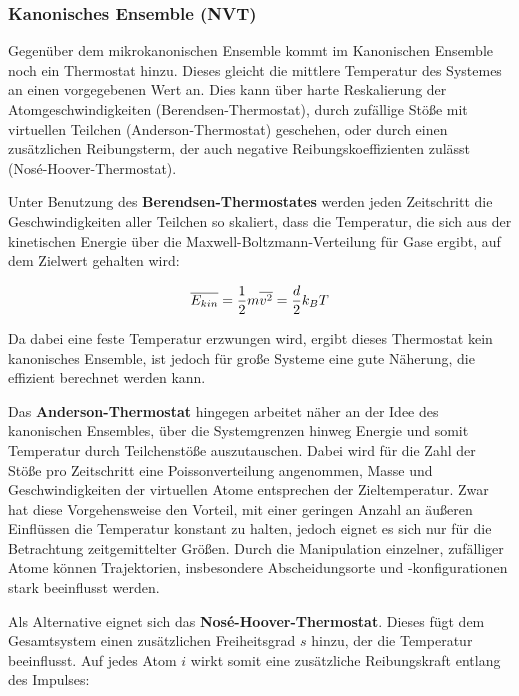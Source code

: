 \subsubsection{Kanonisches Ensemble (NVT)}

Gegenüber dem mikrokanonischen Ensemble kommt im Kanonischen Ensemble noch ein Thermostat hinzu.
Dieses gleicht die mittlere Temperatur des Systemes an einen vorgegebenen Wert an.
Dies kann über harte Reskalierung der Atomgeschwindigkeiten (Berendsen-Thermostat), durch zufällige Stöße mit virtuellen Teilchen (Anderson-Thermostat) geschehen, oder durch einen zusätzlichen Reibungsterm, der auch negative Reibungskoeffizienten zulässt (Nosé-\-Hoover-\-Thermostat).

Unter Benutzung des \textbf{Berendsen-Thermostates} werden jeden Zeitschritt die Geschwindigkeiten aller Teilchen so skaliert, dass die Temperatur, die sich aus der kinetischen Energie über die Maxwell-Boltzmann-Verteilung für Gase ergibt, auf dem Zielwert gehalten wird:

\begin{equation}
  \overline{E_{kin}} = {1\over2} m\overline{v^2} = {d\over2}k_BT
\end{equation}


Da dabei eine feste Temperatur erzwungen wird, ergibt dieses Thermostat kein kanonisches Ensemble, ist jedoch für große Systeme eine gute Näherung, die effizient berechnet werden kann.

Das \textbf{Anderson-Thermostat} hingegen arbeitet näher an der Idee des kanonischen Ensembles, über die Systemgrenzen hinweg Energie und somit Temperatur durch Teilchenstöße auszutauschen.
Dabei wird für die Zahl der Stöße pro Zeitschritt eine Poissonverteilung angenommen, Masse und Geschwindigkeiten der virtuellen Atome entsprechen der Zieltemperatur.
Zwar hat diese Vorgehensweise den Vorteil, mit einer geringen Anzahl an äußeren Einflüssen die Temperatur konstant zu halten, jedoch eignet es sich nur für die Betrachtung zeitgemittelter Größen.
Durch die Manipulation einzelner, zufälliger Atome können Trajektorien, insbesondere Abscheidungsorte und -konfigurationen stark beeinflusst werden.

Als Alternative eignet sich das \textbf{Nosé-Hoover-Thermostat}.
Dieses fügt dem Gesamtsystem einen zusätzlichen Freiheitsgrad $s$ hinzu, der die Temperatur beeinflusst.
Auf jedes Atom $i$ wirkt somit eine zusätzliche Reibungskraft entlang des Impulses:

